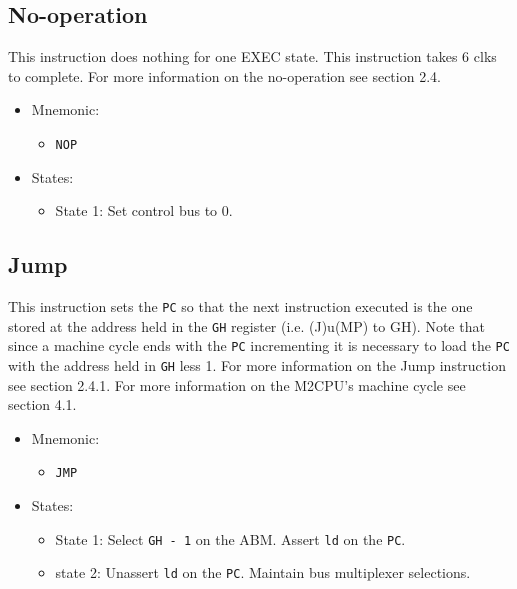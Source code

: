 \documentclass[a4paper,12pt]{article}
\newcommand{\mt}{M2CPU}
\newcommand{\Gr}{\texttt{G}}
\newcommand{\Hr}{\texttt{H}}
\newcommand{\PC}{\texttt{PC}}
\begin{document}
\subsection{No-operation}
This instruction does nothing for one EXEC state. This instruction takes 6 clks
to complete. For more information on the no-operation see section 2.4.
\begin{itemize}
\item Mnemonic:
\begin{itemize}
	\item \texttt{NOP}
\end{itemize}
\item States:
\begin{itemize}
	\item State 1: Set control bus to 0.
\end{itemize}
\end{itemize}

\subsection{Jump}
This instruction sets the \PC{} so that the next instruction executed is the one
stored at the address held in the \Gr{}\Hr{} register (i.e. (J)u(MP) to GH).
Note that since a machine cycle ends with the \PC{} incrementing it is 
necessary to load the \PC{} with the address held in \Gr{}\Hr{} less 1. For 
more information on the Jump instruction see section 2.4.1. For more 
information on the \mt{}'s machine cycle see section 4.1.
\par

\begin{itemize}
\item Mnemonic:
\begin{itemize}
	\item \texttt{JMP}
\end{itemize}
\item States:
\begin{itemize}
	\item State 1: Select \texttt{GH - 1} on the ABM. Assert \texttt{ld} on
	the \PC{}.
	\item state 2: Unassert \texttt{ld} on the \PC{}. Maintain bus 
	multiplexer selections.
\end{itemize}
\end{itemize}
\end{document}
